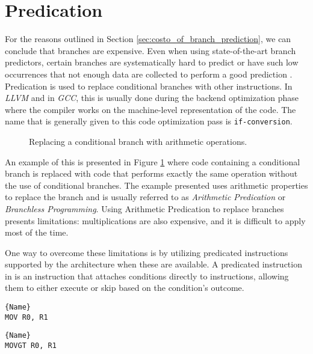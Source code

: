 \section{Predication}
\label{sec:predication}

For the reasons outlined in Section \ref{sec:costo_of_branch_prediction}, we can conclude that branches are expensive. Even when using state-of-the-art branch predictors, certain branches are systematically hard to predict or have such low occurrences that not enough data are collected to perform a good prediction \cite{lin2019branch}.
Predication is used to replace conditional branches with other instructions. In \textit{LLVM} and in \textit{GCC}, this is usually done during the backend optimization phase where the compiler works on the machine-level representation of the code. The name that is generally given to this code optimization pass is \texttt{if-conversion}.

\begin{figure}[h!]
\centering

\caption[Replacing a Conditional Branch with Arithmetic Operations]{Replacing a conditional branch with arithmetic operations.}
\label{fig:branching_predication_example}
\end{figure}

An example of this is presented in Figure \ref{fig:branching_predication_example} where code containing a conditional branch is replaced with code that performs exactly the same operation without the use of conditional branches. The example presented uses arithmetic properties to replace the branch and is usually referred to as \textit{Arithmetic Predication} or \textit{Branchless Programming}. Using Arithmetic Predication to replace branches presents limitations: multiplications are also expensive, and it is difficult to apply most of the time.

One way to overcome these limitations is by utilizing predicated instructions supported by the architecture when these are available. A predicated instruction in \armvs is an instruction that attaches conditions directly to instructions, allowing them to either execute or skip based on the condition's outcome. \newline

\noindent\begin{minipage}{.45\textwidth}
\begin{lstlisting}[caption=Standard MOV in ARMv7 assembly, style=AsmStyle, label={lst:add}]{Name}
MOV R0, R1
\end{lstlisting}
\end{minipage}\hfill
\begin{minipage}{.45\textwidth}
\begin{lstlisting}[caption=Predicated MOV in ARMv7 assembly, style=AsmStyle, label={lst:cadd}]{Name}
MOVGT R0, R1
\end{lstlisting}
\end{minipage}

